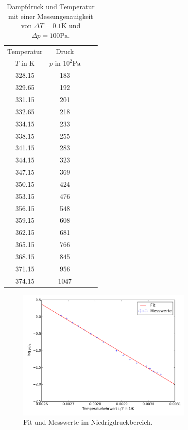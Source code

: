 \begin{table}
  \centering
  \begin{tabular}{c c c c}
    \toprule
    Temperatur & Druck \\
    $T$ in $\si{\kelvin}$ & $p$ in $ 10^2\si{\pascal}$ &  & \\
    \midrule
    328.15  &   183  &    &  \\
    329.65  &   192  &    &  \\
    331.15  &   201  &    &  \\
    332.65  &   218  &    &  \\
    334.15  &   233  &    &  \\
    338.15  &   255  &    &  \\
    341.15  &   283  &    &  \\
    344.15  &   323  &    &  \\
    347.15  &   369  &    &  \\
    350.15  &   424  &    &  \\
    353.15  &   476  &    &  \\
    356.15  &   548  &    &  \\
    359.15  &   608  &    &  \\
    362.15  &   681  &    &  \\
    365.15  &   766  &    &  \\
    368.15  &   845  &    &  \\
    371.15  &   956  &    &  \\
    374.15  &  1047  &    &  \\
    \bottomrule
  \end{tabular}
  \caption{Dampfdruck und Temperatur mit einer Messungenauigkeit von
  $\Delta T=0.1\si{\kelvin}$ und $\Delta p=100 \si{\pascal}$.}
  \label{tab:messung1}
\end{table}
\begin{figure}
  \centering
  \includegraphics[width=0.78\textwidth]{verdampfungwaerme1.pdf}
  \caption{Fit und Messwerte im Niedrigdruckbereich.}
  \label{fig:fit1}
\end{figure}
